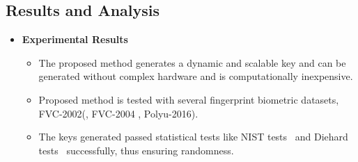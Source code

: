\subsection{Results and Analysis}
\begin{frame}[t]{\subsecname}
	\topline
    \begin{itemize}
    	\item \textcolor{navy_theme}{\textbf{Experimental Results}}
    	\vspace{1em}
			\begin{itemize}
				\setlength\itemsep{1em}
				\item<1,4> The proposed method generates a dynamic and scalable key
				and can be generated without complex hardware and is computationally
				inexpensive.
				\item<2,4> Proposed method is tested with several fingerprint biometric datasets, FVC-2002(\cite{maio2002fvc2002}, FVC-2004 \cite{maio2004fvc2004}, Polyu-2016\cite{polyu2016database}).
				\item<3,4> The keys generated passed statistical tests like NIST tests~\cite{pareschi2012statistical} and Diehard
					tests~\cite{marsaglia1998diehard} successfully, thus ensuring randomness.
			\end{itemize}
	\end{itemize}
\end{frame}